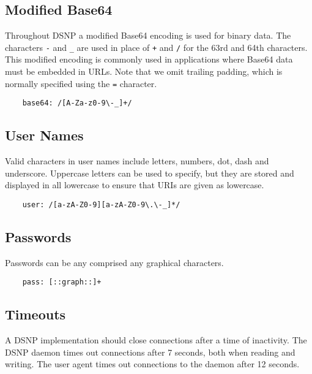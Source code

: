 \documentclass[letterpaper,11pt,oneside]{article}
\begin{document}
\subsection{Modified Base64}

Throughout DSNP a modified Base64 encoding is used for binary data. The
characters \verb|-| and \verb|_| are used in place of \verb|+| and \verb|/| for
the 63rd and 64th characters. This modified encoding is commonly used in
applications where Base64 data must be embedded in URLs. Note that we omit
trailing padding, which is normally specified using the \verb|=| character.

\vspace{10pt}
\begin{verbatim}
    base64: /[A-Za-z0-9\-_]+/
\end{verbatim}
\vspace{10pt}

\subsection{User Names}

Valid characters in user names include letters, numbers, dot, dash and
underscore. Uppercase letters can be used to specify, but they are stored and
displayed in all lowercase to ensure that URIs are given as lowercase.

\vspace{10pt}
\begin{verbatim}
    user: /[a-zA-Z0-9][a-zA-Z0-9\.\-_]*/
\end{verbatim}
\vspace{10pt}

\subsection{Passwords}

Passwords can be any comprised any graphical characters.

\vspace{10pt}
\begin{verbatim}
    pass: [::graph::]+
\end{verbatim}
\vspace{10pt}

\subsection{Timeouts}

A DSNP implementation should close connections after a time of inactivity. The
DSNP daemon times out connections after 7 seconds, both when reading and
writing. The user agent times out connections to the daemon after 12 seconds.
\end{document}
